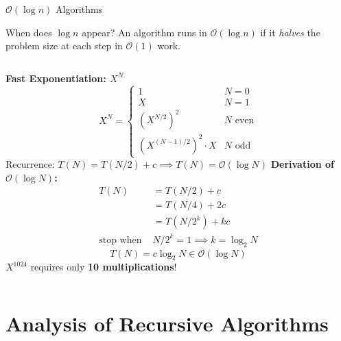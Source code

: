 \documentclass[aspectratio=169]{beamer}
\begin{document}
\begin{frame}[shrink=12]{$\mathcal{O}(\log n)$ Algorithms}
  \begin{block}{When does $\log n$ appear?}
    An algorithm runs in $\mathcal{O}(\log n)$ if it \emph{halves}
    the problem size at each step in $\mathcal{O}(1)$ work.
  \end{block}
  \vspace{0.3em}
  \begin{columns}[T]
      \textbf{Fast Exponentiation: $X^N$}
      \[
        X^N = \begin{cases}
          1                       & N = 0 \\
          X                       & N = 1 \\
          (X^{N/2})^2             & N \text{ even} \\
          (X^{(N-1)/2})^2 \cdot X & N \text{ odd}
        \end{cases}
      \]
      \vspace{0.2em}
      Recurrence: $T(N) = T(N/2) + c \implies T(N) = \mathcal{O}(\log N)$
      \textbf{Derivation of $\mathcal{O}(\log N)$:}
      \begin{align*}
        T(N) &= T(N/2) + c \\
             &= T(N/4) + 2c \\
             &= T(N/2^k) + kc \\
        \text{stop when } &N/2^k = 1 \implies k = \log_2 N
      \end{align*}
      \[
        T(N) = c\log_2 N \in \mathcal{O}(\log N)
      \]
      \vspace{0.2em}
      $X^{1024}$ requires only \textbf{10 multiplications}!
  \end{columns}
\end{frame}

\section{Analysis of Recursive Algorithms}
\end{document}
